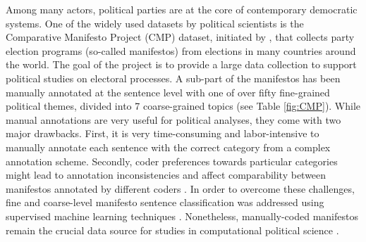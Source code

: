 \documentclass[11pt,a4paper]{article}
\begin{document}


Among many actors, political parties are at the core of contemporary democratic systems. One of the widely used datasets by political scientists is the Comparative
Manifesto Project (CMP) dataset, initiated by , that collects party election programs (so-called manifestos) from elections in many countries around the world. The goal of the project is to provide a large data collection to support political studies on electoral processes. A sub-part of the manifestos has been manually annotated at the sentence level with one of over fifty fine-grained political themes, divided into 7 coarse-grained topics (see Table \ref{fig:CMP}).  While manual annotations are very useful for political analyses, they come with two major drawbacks. First, it is very time-consuming and labor-intensive to manually annotate each sentence with the correct category from a complex annotation scheme. Secondly, coder preferences towards particular categories might lead to annotation inconsistencies and affect comparability between manifestos annotated by different coders \cite{coder}. In order to overcome these challenges, fine and coarse-level manifesto sentence classification was addressed using supervised machine learning techniques \cite{verberne2014automatic, zirn2016classifying}. Nonetheless, manually-coded manifestos remain the crucial data source for studies in computational political science \cite{lowe2011scaling, nanni}. 
\end{document}
